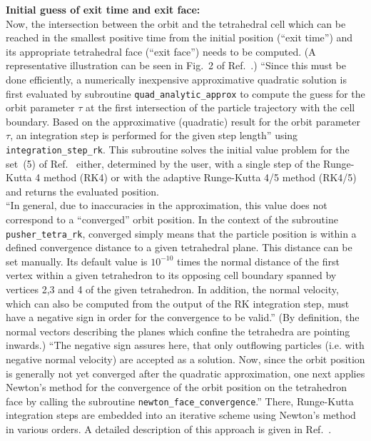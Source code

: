 \documentclass{TheMartianReport}
\begin{document}
\textbf{Initial guess of exit time and exit face:}\\
Now, the intersection between the orbit and the tetrahedral cell which can be reached in the smallest positive time from the initial position (``exit time'') and its appropriate tetrahedral face (``exit face'') needs to be computed. (A representative illustration can be seen in Fig.~2 of Ref.~.) ``Since this must be done efficiently, a numerically inexpensive approximative quadratic solution is first evaluated by subroutine \texttt{quad\_analytic\_approx} to compute the guess for the orbit parameter $\tau$ at the first intersection of the particle trajectory with the cell boundary. Based on the approximative (quadratic) result for the orbit parameter $\tau$, an integration step is performed for the given step length''\cite{bauer_master_2020} using \texttt{integration\_step\_rk}. This subroutine solves the initial value problem for the set~(5) of Ref.~ either, determined by the user, with a single step of the Runge-Kutta 4 method (RK4) or with the adaptive Runge-Kutta 4/5 method (RK4/5) and returns the evaluated position. \\
%
``In general, due to inaccuracies in the approximation, this value does not correspond to a ``converged'' orbit position. In the context of the subroutine \texttt{pusher\_tetra\_rk}, converged simply means that the particle position is within a defined convergence distance to a given tetrahedral plane. This distance can be set manually. Its default value is $10^{-10}$ times the normal distance of the first vertex within a given tetrahedron to its opposing cell boundary spanned by vertices 2,3 and 4 of the given tetrahedron. In addition, the normal velocity, which can also be computed from the output of the RK integration step, must have a negative sign in order for the convergence to be valid.''\cite{bauer_master_2020} (By definition, the normal vectors describing the planes which confine the tetrahedra are pointing inwards.) ``The negative sign assures here, that only outflowing particles (i.e. with negative normal velocity) are accepted as a solution.  
Now, since the orbit position is generally not yet converged after the quadratic approximation, one next applies Newton's method for the convergence of the orbit position on the tetrahedron face by calling the subroutine \texttt{newton\_face\_convergence}.''\cite{bauer_master_2020} There, Runge-Kutta integration steps are embedded into an iterative scheme using Newton’s method in various orders. A detailed description of this approach is given in Ref.~.\\
\end{document}
